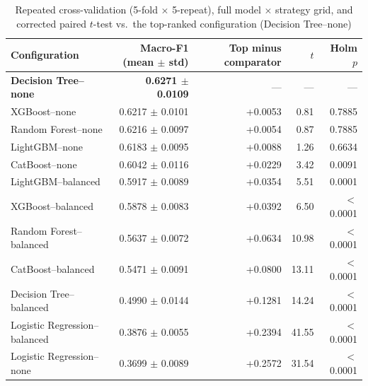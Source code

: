 \documentclass[11pt,a4paper]{article}
\begin{document}
\begin{table}[H]
\centering
\caption{Repeated cross-validation (5-fold $\times$ 5-repeat), full model $\times$ strategy grid, and corrected paired $t$-test vs.\ the top-ranked configuration (Decision Tree--none)}
\small
\begin{tabular}{lrrrr}
\toprule
Configuration & Macro-F1 (mean $\pm$ std) & Top minus comparator & $t$ & Holm $p$ \\
\midrule
\textbf{Decision Tree--none} & \textbf{0.6271 $\pm$ 0.0109} & --- & --- & --- \\
XGBoost--none & 0.6217 $\pm$ 0.0101 & +0.0053 & 0.81 & 0.7885 \\
Random Forest--none & 0.6216 $\pm$ 0.0097 & +0.0054 & 0.87 & 0.7885 \\
LightGBM--none & 0.6183 $\pm$ 0.0095 & +0.0088 & 1.26 & 0.6634 \\
CatBoost--none & 0.6042 $\pm$ 0.0116 & +0.0229 & 3.42 & 0.0091 \\
LightGBM--balanced & 0.5917 $\pm$ 0.0089 & +0.0354 & 5.51 & 0.0001 \\
XGBoost--balanced & 0.5878 $\pm$ 0.0083 & +0.0392 & 6.50 & $<$0.0001 \\
Random Forest--balanced & 0.5637 $\pm$ 0.0072 & +0.0634 & 10.98 & $<$0.0001 \\
CatBoost--balanced & 0.5471 $\pm$ 0.0091 & +0.0800 & 13.11 & $<$0.0001 \\
Decision Tree--balanced & 0.4990 $\pm$ 0.0144 & +0.1281 & 14.24 & $<$0.0001 \\
Logistic Regression--balanced & 0.3876 $\pm$ 0.0055 & +0.2394 & 41.55 & $<$0.0001 \\
Logistic Regression--none & 0.3699 $\pm$ 0.0089 & +0.2572 & 31.54 & $<$0.0001 \\
\bottomrule
\end{tabular}
\end{table}
\end{document}
